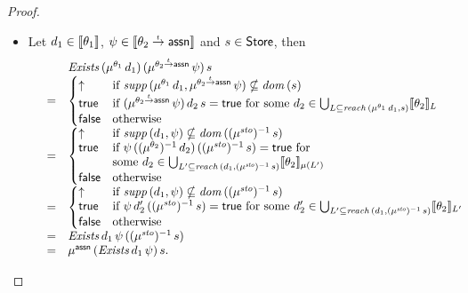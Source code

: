 \documentclass[12pt,a4paper]{report}
\newcommand{\ssto}{\nstyle{sto}}
\newcommand{\Exists}{\nstyle{Exists}}
\begin{document}
\begin{proof}
\begin{itemize}
    \item Let $d_1 \in \llbracket\theta_1\rrbracket$, $\psi \in \llbracket\theta_2\stackrel{_t}{\to}\mathsf{assn}\rrbracket$
          and $s \in \mathsf{Store}$, then
          \[\begin{array}{rcl}
            & & \Exists\,(\mu^{\theta_1}\,d_1)\,(\mu^{\ttarrow{\theta_2}{\tassn}}\,\psi)\,s \\
            &=& \bcase
                  \uparrow  & \text{if } \supp{\mu^{\theta_1}\,d_1,\mu^{\ttarrow{\theta_2}{\tassn}}\,\psi}
                              \nsubseteq \dom{s} \\
                  \true     & \text{if } (\mu^{\ttarrow{\theta_2}{\tassn}}\,\psi)\,d_2\,s = \true \text{ for some }
                              d_2 \in \bigcup_{L\subseteq\reach{\mu^{\theta_1}\,d_1}{s}} \semantic{\theta_2}_L \\
                  \false    & \text{otherwise}
                \ecase \\
            &=& \bcase
                  \uparrow  & \text{if } \supp{d_1,\psi} \nsubseteq \dom{(\mu^\ssto)^{-1}\,s} \\
                  \true     & \text{if } \psi\,((\mu^{\theta_2})^{-1}\,d_2)\,((\mu^\ssto)^{-1}\,s)=\true \text{ for} \\
                            & \text{some } d_2 \in \bigcup_{L'\subseteq\reach{d_1}{(\mu^\ssto)^{-1}\,s}} 
                                  \semantic{\theta_2}_{\mu(L')} \\
                  \false    & \text{otherwise}
                \ecase \\
            &=& \bcase
                  \uparrow  & \text{if } \supp{d_1,\psi} \nsubseteq \dom{(\mu^\ssto)^{-1}\,s} \\
                  \true     & \text{if } \psi\,d_2'\,((\mu^\ssto)^{-1}\,s)=\true \text{ for some }
                              d_2'\in\bigcup_{L'\subseteq \reach{d_1}{(\mu^\ssto)^{-1}\,s}} \semantic{\theta_2}_{L'} \\
                  \false    & \text{otherwise}
                \ecase \\
            &=& \Exists\,d_1\,\psi\,((\mu^\ssto)^{-1}\,s) \\
            &=& \mu^\tassn\,(\Exists\,d_1\,\psi)\,s.
          \end{array}\]
  \end{itemize}
\end{proof}
\end{document}

